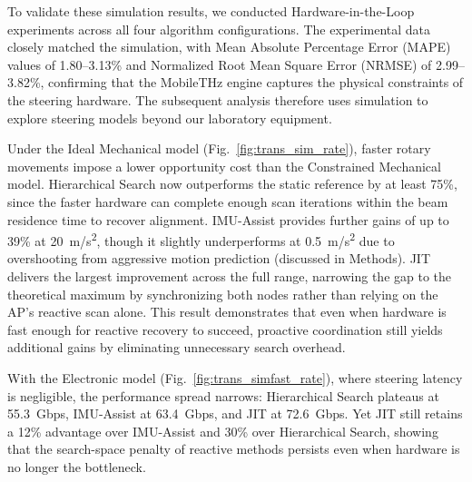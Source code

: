 \documentclass[fleqn,10pt]{wlscirep}
\begin{document}
To validate these simulation results, we conducted Hardware-in-the-Loop experiments across all four algorithm configurations. The experimental data closely matched the simulation, with Mean Absolute Percentage Error (MAPE) values of 1.80--3.13\% and Normalized Root Mean Square Error (NRMSE) of 2.99--3.82\%, confirming that the MobileTHz engine captures the physical constraints of the steering hardware. The subsequent analysis therefore uses simulation to explore steering models beyond our laboratory equipment.

Under the Ideal Mechanical model (Fig.~\ref{fig:trans_sim_rate}), faster rotary movements impose a lower opportunity cost than the Constrained Mechanical model. Hierarchical Search now outperforms the static reference by at least 75\%, since the faster hardware can complete enough scan iterations within the beam residence time to recover alignment. IMU-Assist provides further gains of up to 39\% at \SI{20}{m/s^2}, though it slightly underperforms at \SI{0.5}{m/s^2} due to overshooting from aggressive motion prediction (discussed in Methods). JIT delivers the largest improvement across the full range, narrowing the gap to the theoretical maximum by synchronizing both nodes rather than relying on the AP's reactive scan alone. This result demonstrates that even when hardware is fast enough for reactive recovery to succeed, proactive coordination still yields additional gains by eliminating unnecessary search overhead.

With the Electronic model (Fig.~\ref{fig:trans_simfast_rate}), where steering latency is negligible, the performance spread narrows: Hierarchical Search plateaus at \SI{55.3}{Gbps}, IMU-Assist at \SI{63.4}{Gbps}, and JIT at \SI{72.6}{Gbps}. Yet JIT still retains a 12\% advantage over IMU-Assist and 30\% over Hierarchical Search, showing that the search-space penalty of reactive methods persists even when hardware is no longer the bottleneck.
\end{document}
